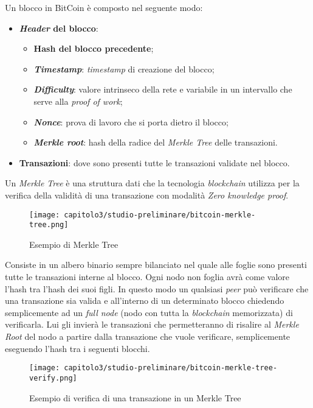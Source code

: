 Un blocco in BitCoin è composto nel seguente modo:
\begin{itemize}
  \item \textbf{\textit{Header} del blocco}:
  \begin{itemize}
    \item \textbf{Hash del blocco precedente};
    \item \textbf{\textit{Timestamp}}: \textit{timestamp} di creazione del blocco;
    \item \textbf{\textit{Difficulty}}: valore intrinseco della rete e variabile in un intervallo che serve alla \textit{proof of work};
    \item \textbf{\textit{Nonce}}: prova di lavoro che si porta dietro il blocco;
    \item \textbf{\textit{Merkle root}}: hash della radice del \textit{Merkle Tree} delle transazioni.
  \end{itemize}
  
  \item \textbf{Transazioni}: dove sono presenti tutte le transazioni validate nel blocco.
\end{itemize}

Un \textit{Merkle Tree} è una struttura dati che la tecnologia \textit{blockchain} utilizza per la verifica della validità di una transazione con modalità \textit{Zero knowledge proof}.

\begin{figure}[h!]
  \centering
  \texttt{[image: capitolo3/studio-preliminare/bitcoin-merkle-tree.png]}
  \caption{Esempio di Merkle Tree}
\end{figure}

Consiste in un albero binario sempre bilanciato nel quale alle foglie sono presenti tutte le transazioni interne al blocco. Ogni nodo non foglia avrà come valore l'hash tra l'hash dei suoi figli. In questo modo un qualsiasi \textit{peer} può verificare che una transazione sia valida e all'interno di un determinato blocco chiedendo semplicemente ad un \textit{full node} (nodo con tutta la \textit{blockchain} memorizzata) di verificarla. Lui gli invierà le transazioni che permetteranno di risalire al \textit{Merkle Root} del nodo a partire dalla transazione che vuole verificare, semplicemente eseguendo l'hash tra i seguenti blocchi.

\clearpage
\begin{figure}[h!]
  \centering
  \texttt{[image: capitolo3/studio-preliminare/bitcoin-merkle-tree-verify.png]}
  \caption{Esempio di verifica di una transazione in un Merkle Tree}
  \label{fig:merkle-tree-verify}
\end{figure}

